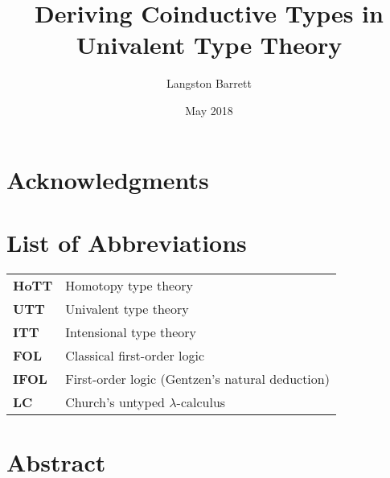 \documentclass[12pt,twoside,draft]{reedthesis}
\title{Deriving Coinductive Types in Univalent Type Theory}
\author{Langston Barrett}
\date{May 2018}
\begin{document}
\maketitle
\frontmatter %
\pagestyle{empty} %

\chapter*{Acknowledgments}


\chapter*{List of Abbreviations}

\begin{table}[h]
  \centering
  \begin{tabular}{ll}
    \textbf{HoTT}  	&  Homotopy type theory \\
    \textbf{UTT}  	&  Univalent type theory \\
    \textbf{ITT}  	&  Intensional type theory \\
    \textbf{FOL}  	&  Classical first-order logic \\
    \textbf{IFOL}  	&  First-order logic (Gentzen's natural deduction) \\
    \textbf{LC}  	  &  Church's untyped $\lambda$-calculus
  \end{tabular}
\end{table}
	
\setcounter{tocdepth}{4}
\tableofcontents

\chapter*{Abstract}
\end{document}
